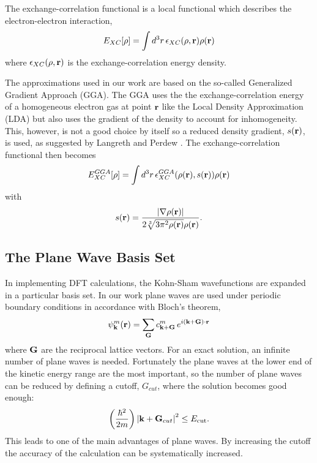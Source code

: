 The exchange-correlation functional is a local functional which describes the electron-electron interaction,
\begin{equation}
\label{eq:XCfunctional}
 E_{XC}[\rho] = \int d^3r\, \epsilon_{XC}(\rho, {\mathrm{\mathbf{\bm{r}}}})\rho({\mathrm{\mathbf{\bm{r}}}})
\end{equation}
where $\epsilon_{XC}(\rho, {\mathrm{\mathbf{\bm{r}}}})$ is the exchange-correlation energy density.

The approximations used in our work are based on the so-called Generalized Gradient Approach (GGA). The GGA uses the the exchange-correlation energy of a homogeneous electron gas at point ${\mathrm{\mathbf{\bm{r}}}}$ like the Local Density Approximation (LDA) \cite{kohn1965} but also uses the gradient of the density to account for inhomogeneity. This, however, is not a good choice by itself so a reduced density gradient, $s({\mathrm{\mathbf{\bm{r}}}})$, is used, as suggested by Langreth and Perdew \cite{langreth1977}. The exchange-correlation functional then becomes
\begin{equation}
  E_{XC}^{GGA}[\rho] = \int d^3r\, \epsilon_{XC}^{GGA}(\rho({\mathrm{\mathbf{\bm{r}}}}), s({\mathrm{\mathbf{\bm{r}}}}))\rho({\mathrm{\mathbf{\bm{r}}}})
\end{equation}
with
\begin{equation}
\label{eq:GGAreducedDensityGradient}
 s({\mathrm{\mathbf{\bm{r}}}}) = \frac{\left|\nabla \rho({\mathrm{\mathbf{\bm{r}}}})\right|}{2\sqrt[3]{3\pi^2\rho({\mathrm{\mathbf{\bm{r}}}})} \rho({\mathrm{\mathbf{\bm{r}}}})}.
\end{equation}

\subsection{The Plane Wave Basis Set}
In implementing DFT calculations, the Kohn-Sham wavefunctions are expanded in a particular basis set. In our work plane waves are used under periodic boundary conditions in accordance with Bloch's theorem,
\begin{equation}
\label{eq:blochsTherom}
 \psi_{\mathrm{\mathbf{\bm{k}}}}^{m}({\mathrm{\mathbf{\bm{r}}}}) = \sum_{\mathrm{\mathbf{\bm{G}}}}c_{{\mathrm{\mathbf{\bm{k}}}} + {\mathrm{\mathbf{\bm{G}}}}}^m\, e^{i({\mathrm{\mathbf{\bm{k}}}}+{\mathrm{\mathbf{\bm{G}}}})\cdot{\ensuremath{\mathrm{\mathbf{\bm{r}}}}}}
\end{equation}
where ${\mathrm{\mathbf{\bm{G}}}}$ are the reciprocal lattice vectors. %
For an exact solution, an infinite number of plane waves is needed. Fortunately the plane waves at the lower end of the kinetic energy range are the most important, so the number of plane waves can be reduced by defining a cutoff, $G_{cut}$, where the solution becomes good enough:
\begin{equation}
 \left( \frac{\hbar^2}{2m} \right) \left| {\mathrm{\mathbf{\bm{k}}}} + {\mathrm{\mathbf{\bm{G}}}}_{cut} \right|^2 \le E_\mathrm{cut}.
\end{equation}
This leads to one of the main advantages of plane waves. By increasing the cutoff the accuracy of the calculation can be systematically increased. 

